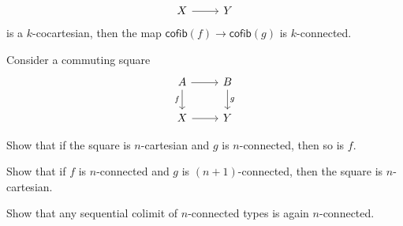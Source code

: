 \begin{exercises}
\begin{equation*}
\begin{tikzcd}
X \arrow[r] & Y
\end{tikzcd}
\end{equation*}
is a $k$-cocartesian, then the map $\mathsf{cofib}(f)\to \mathsf{cofib}(g)$ is $k$-connected.
\item Consider a commuting square
\begin{equation*}
\begin{tikzcd}
A \arrow[d,swap,"f"] \arrow[r] & B \arrow[d,"g"] \\
X \arrow[r] & Y
\end{tikzcd}
\end{equation*}
\begin{subexenum}
\item Show that if the square is $n$-cartesian and $g$ is $n$-connected, then so is $f$.
\item Show that if $f$ is $n$-connected and $g$ is $(n+1)$-connected, then the square is $n$-cartesian. 
\end{subexenum}
\item Show that any sequential colimit of $n$-connected types is again $n$-connected.
\end{exercises}
